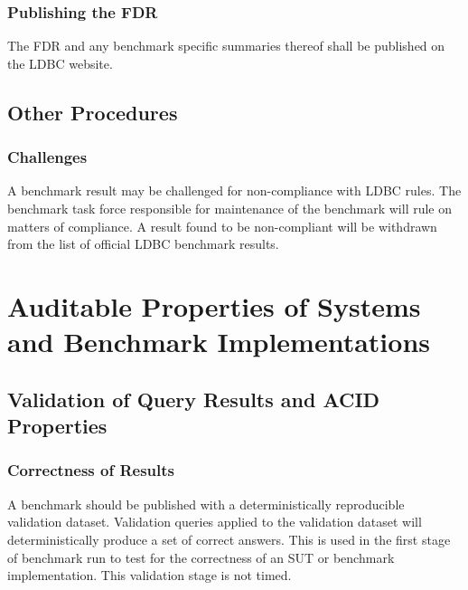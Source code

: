 \subsubsection{Publishing the FDR}
The FDR and any benchmark specific summaries thereof shall be published on the LDBC website.

\subsection{Other Procedures}

\subsubsection{Challenges}
A benchmark result may be challenged for non-compliance with LDBC rules. The benchmark task force responsible for maintenance of the benchmark will rule on matters of compliance. A result found to be non-compliant will be withdrawn from the list of official LDBC benchmark results.


\section{Auditable Properties of Systems and Benchmark Implementations}


\subsection{Validation of Query Results and ACID Properties}

\subsubsection{Correctness of Results}

A benchmark should be published with a deterministically reproducible validation dataset. Validation queries applied to the validation dataset will deterministically produce a set of correct answers. This is used in the first stage of benchmark run to test for the correctness of an SUT or benchmark implementation. This validation stage is not timed.

